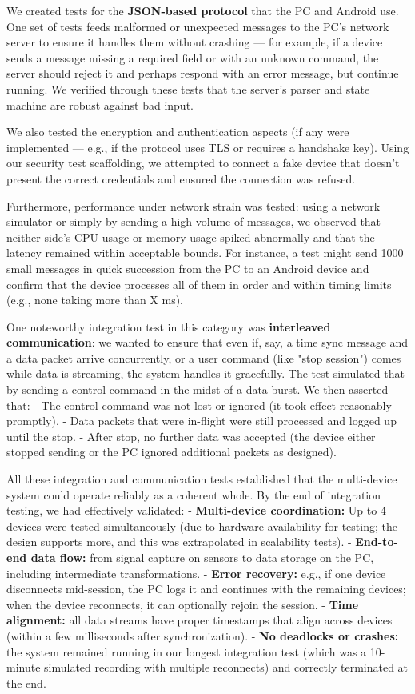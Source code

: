 We created tests for the \textbf{JSON-based protocol} that the PC and Android
use. One set of tests feeds malformed or unexpected messages to the PC's
network server to ensure it handles them without crashing --- for
example, if a device sends a message missing a required field or with an
unknown command, the server should reject it and perhaps respond with an
error message, but continue running. We verified through these tests
that the server's parser and state machine are robust against bad input.

We also tested the encryption and authentication aspects (if any were
implemented --- e.g., if the protocol uses TLS or requires a handshake
key). Using our security test scaffolding, we attempted to connect a
fake device that doesn't present the correct credentials and ensured the
connection was refused.

Furthermore, performance under network strain was tested: using a
network simulator or simply by sending a high volume of messages, we
observed that neither side's CPU usage or memory usage spiked abnormally
and that the latency remained within acceptable bounds. For instance, a
test might send 1000 small messages in quick succession from the PC to
an Android device and confirm that the device processes all of them in
order and within timing limits (e.g., none taking more than X ms).

One noteworthy integration test in this category was \textbf{interleaved
communication}: we wanted to ensure that even if, say, a time sync
message and a data packet arrive concurrently, or a user command (like
"stop session") comes while data is streaming, the system handles it
gracefully. The test simulated that by sending a control command in the
midst of a data burst. We then asserted that: - The control command was
not lost or ignored (it took effect reasonably promptly). - Data packets
that were in-flight were still processed and logged up until the stop. -
After stop, no further data was accepted (the device either stopped
sending or the PC ignored additional packets as designed).

All these integration and communication tests established that the
multi-device system could operate reliably as a coherent whole. By the
end of integration testing, we had effectively validated: -
\textbf{Multi-device coordination:} Up to 4 devices were tested
simultaneously (due to hardware availability for testing; the design
supports more, and this was extrapolated in scalability tests). -
\textbf{End-to-end data flow:} from signal capture on sensors to data storage
on the PC, including intermediate transformations. - \textbf{Error recovery:}
e.g., if one device disconnects mid-session, the PC logs it and
continues with the remaining devices; when the device reconnects, it can
optionally rejoin the session. - \textbf{Time alignment:} all data streams
have proper timestamps that align across devices (within a few
milliseconds after synchronization). - \textbf{No deadlocks or crashes:} the
system remained running in our longest integration test (which was a
10-minute simulated recording with multiple reconnects) and correctly
terminated at the end.

